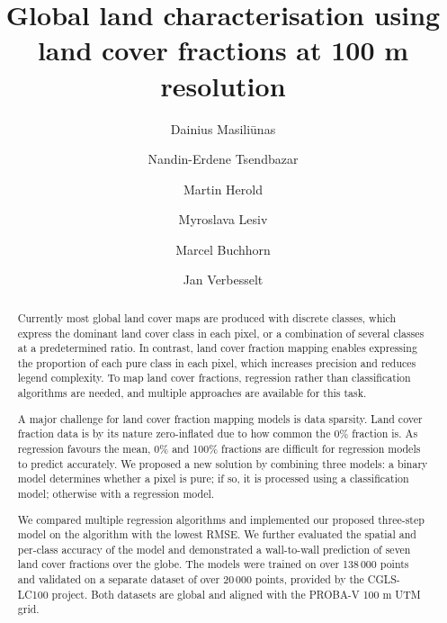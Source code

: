 \documentclass[review,authoryear,3p]{elsarticle}
\begin{document}
\begin{frontmatter} %

\title{Global land characterisation using land cover fractions at 100 m resolution}

\author[WURGRS]{Dainius Masiliūnas}

\author[WURGRS]{Nandin-Erdene Tsendbazar}

\author[WURGRS]{Martin Herold}

\author[IIASA]{Myroslava Lesiv}

\author[VITO]{Marcel Buchhorn}

\author[WURGRS]{Jan Verbesselt}

\address[WURGRS]{Wageningen University \& Research, Laboratory of Geo-Information Science and Remote Sensing, Droevendaalsesteeg 3, 6708 PB Wageningen, the Netherlands}
\address[IIASA]{International Institute for Applied Systems Analysis (IIASA), Schlossplatz 1, A-2361 Laxenburg, Austria}
\address[VITO]{Flemish Institute for Technological Research (VITO), Boeretang 200, BE-2400 Mol, Belgium}

\begin{abstract} %
Currently most global land cover maps are produced with discrete classes, which express the dominant land cover class in each pixel, or a combination of several classes at a predetermined ratio. In contrast, land cover fraction mapping enables expressing the proportion of each pure class in each pixel, which increases precision and reduces legend complexity. To map land cover fractions, regression rather than classification algorithms are needed, and multiple approaches are available for this task.

A major challenge for land cover fraction mapping models is data sparsity. Land cover fraction data is by its nature zero-inflated due to how common the 0\% fraction is. As regression favours the mean, 0\% and 100\% fractions are difficult for regression models to predict accurately. We proposed a new solution by combining three models: a binary model determines whether a pixel is pure; if so, it is processed using a classification model; otherwise with a regression model.

We compared multiple regression algorithms and implemented our proposed three-step model on the algorithm with the lowest RMSE.
We further evaluated the spatial and per-class accuracy of the model and demonstrated a wall-to-wall prediction of seven land cover fractions over the globe. 
The models were trained on over 138\,000 points and validated on a separate dataset of over 20\,000 points, provided by the \gls{CGLS-LC100} project. Both datasets are global and aligned with the PROBA-V 100 m UTM grid.


\end{abstract}
\end{frontmatter}
\end{document}
